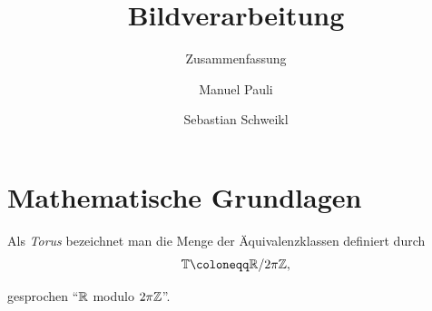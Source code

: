 
\usepackage[pdftex]{graphicx}  


\title{Bildverarbeitung}
\subtitle{Zusammenfassung}
\author{Manuel Pauli\and{}Sebastian Schweikl}

\maketitle

\section{Mathematische Grundlagen}

\begin{definition}[Torus]
Als \emph{Torus} bezeichnet man die Menge der Äquivalenzklassen definiert durch
\[
  \T \coloneqq \R / 2\pi\Z,
\]

gesprochen \enquote{$ \mathbb{R} $ modulo $ 2\pi\mathbb{Z} $}.
\end{definition}

